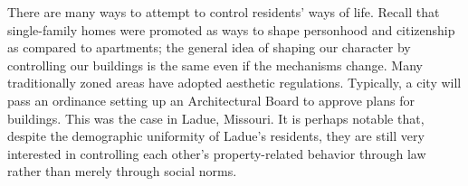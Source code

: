 
There are many ways to attempt to control residents' ways of life. Recall that
single-family homes were promoted as ways to shape personhood and citizenship as
compared to apartments; the general idea of shaping our character by controlling
our buildings is the same even if the mechanisms change. Many traditionally
zoned areas have adopted aesthetic regulations. Typically, a city will pass an
ordinance setting up an Architectural Board to approve plans for buildings. This
was the case in Ladue, Missouri. It is perhaps notable that, despite the
demographic uniformity of Ladue's residents, they are still very interested in
controlling each other's property-related behavior through law rather than
merely through social norms.

